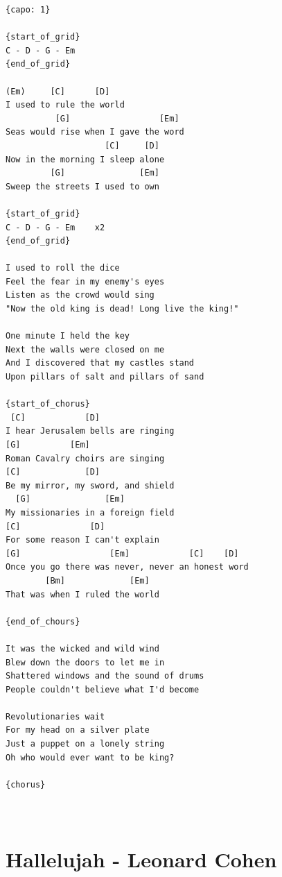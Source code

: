 \documentclass[
]{book}
\let\stdsection\section
\renewcommand\section{\clearpage\stdsection}
\begin{document}
\begin{verbatim}
{capo: 1}

{start_of_grid}
C - D - G - Em 
{end_of_grid}

(Em)     [C]      [D]
I used to rule the world
          [G]                  [Em]
Seas would rise when I gave the word
                    [C]     [D]
Now in the morning I sleep alone    
         [G]               [Em]
Sweep the streets I used to own

{start_of_grid}
C - D - G - Em    x2
{end_of_grid}

I used to roll the dice 
Feel the fear in my enemy's eyes 
Listen as the crowd would sing 
"Now the old king is dead! Long live the king!" 

One minute I held the key 
Next the walls were closed on me 
And I discovered that my castles stand 
Upon pillars of salt and pillars of sand 

{start_of_chorus}
 [C]            [D]
I hear Jerusalem bells are ringing
[G]          [Em]
Roman Cavalry choirs are singing
[C]             [D]
Be my mirror, my sword, and shield
  [G]               [Em]
My missionaries in a foreign field
[C]              [D]
For some reason I can't explain
[G]                  [Em]            [C]    [D]
Once you go there was never, never an honest word
        [Bm]             [Em]
That was when I ruled the world

{end_of_chours}

It was the wicked and wild wind 
Blew down the doors to let me in 
Shattered windows and the sound of drums 
People couldn't believe what I'd become 

Revolutionaries wait 
For my head on a silver plate 
Just a puppet on a lonely string 
Oh who would ever want to be king? 

{chorus}



\end{verbatim}

\hypertarget{hallelujah---leonard-cohen}{%
\section{Hallelujah - Leonard Cohen}\label{hallelujah---leonard-cohen}}
\end{document}
